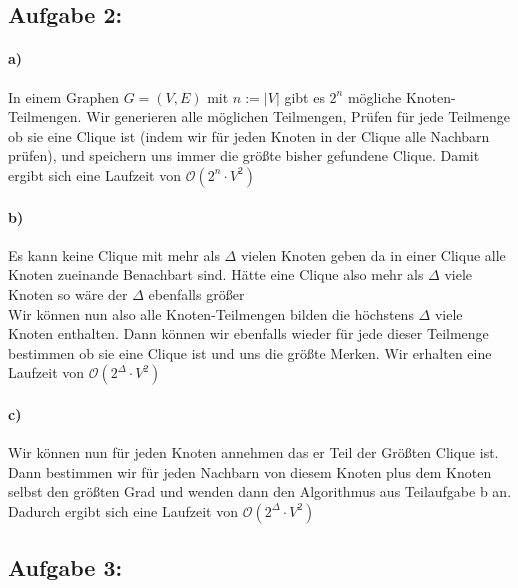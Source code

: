 \documentclass[a4paper]{article}
\def\Oh{\ensuremath{\mathcal{O}}} %
\begin{document}
\subsection*{Aufgabe 2:}
\paragraph*{a)}
In einem Graphen $G = (V, E)$ mit $n := |V|$ gibt es $2^n$ mögliche Knoten-Teilmengen.
Wir generieren alle möglichen Teilmengen, Prüfen für jede Teilmenge ob sie eine Clique ist
(indem wir für jeden Knoten in der Clique alle Nachbarn prüfen),
und speichern uns immer die größte bisher gefundene Clique. Damit ergibt sich eine Laufzeit
von $\Oh(2^n \cdot V^2)$
\paragraph*{b)}
Es kann keine Clique mit mehr als $\Delta$ vielen Knoten geben da in einer Clique alle
Knoten zueinande Benachbart sind. Hätte eine Clique also mehr als $\Delta$ viele Knoten 
so wäre der $\Delta$ ebenfalls größer \\
Wir können nun also alle Knoten-Teilmengen bilden die höchstens $\Delta$ viele Knoten
enthalten. Dann können wir ebenfalls wieder für jede dieser Teilmenge bestimmen ob 
sie eine Clique ist und uns die größte Merken. Wir erhalten eine Laufzeit von 
$\Oh(2^{\Delta} \cdot V^2)$ 
\paragraph*{c)}
Wir können nun für jeden Knoten annehmen das er Teil der Größten Clique ist. Dann bestimmen
wir für jeden Nachbarn von diesem Knoten plus dem Knoten selbst den größten Grad und wenden
dann den Algorithmus aus Teilaufgabe b an. Dadurch ergibt sich eine Laufzeit von 
$\Oh(2^{\Delta} \cdot V^2)$
\subsection*{Aufgabe 3:}
\end{document}
